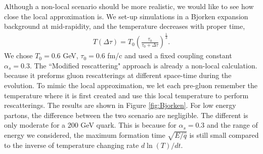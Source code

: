 \documentclass[aps, prc, reprint, amsmath, groupedaddress, nofootinbib]{revtex4-1}
\begin{document}
Although a non-local scenario should be more realistic, we would like to see how close the local approximation is.
We set-up simulations in a Bjorken expansion background at mid-rapidity, and the temperature decreases with proper time,
\begin{eqnarray}
T(\Delta\tau) = T_0 \left(\frac{\tau_0}{\tau_0+\Delta\tau}\right)^{\frac{1}{3}}.
\end{eqnarray}
We chose $T_0=0.6$ GeV, $\tau_0=0.6$ fm/c and used a fixed coupling constant $\alpha_s = 0.3$.
The ``Modified rescattering" approach is already a non-local calculation. because it preforms gluon rescatterings at different space-time during the evolution. 
To mimic the local approximation, we let each pre-gluon remember the temperature where it is first created and use this local temperature to perform rescatterings.
The results are shown in Figure \ref{fig:Bjorken}. 
For low energy partons, the difference between the two scenario are negligible. The different is only moderate for a 200 GeV quark.
This is because for $\alpha_s = 0.3$ and the range of energy we considered, the maximum formation time $\sqrt{E/\hat{q}}$ is still small compared to the inverse of temperature changing rate $d\ln(T)/dt$.
\end{document}
